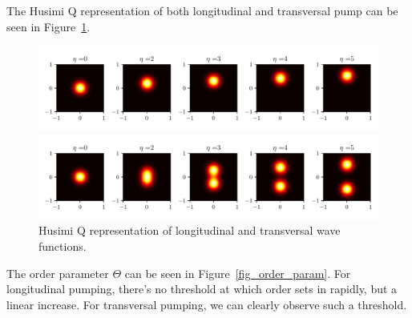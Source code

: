 \noindent The Husimi Q representation of both longitudinal and transversal pump can be seen in Figure~\ref{qfunc}.

\begin{figure}[!htb]
	\begin{minipage}[b]{1\linewidth}
	\centering
	\includegraphics[width=1\textwidth]{images/qfunc_long.pdf}
	\end{minipage}
%
	\begin{minipage}[b]{1\linewidth}
	\centering
	\includegraphics[width=1\textwidth]{images/qfunc_trans.pdf}
	\end{minipage}
\caption{Husimi Q representation of longitudinal and transversal wave functions.}
\label{qfunc}
\end{figure}
\FloatBarrier

\noindent The order parameter $\Theta$ can be seen in Figure~\ref{fig_order_param}. For longitudinal pumping, there's no threshold at which order sets in rapidly, but a linear increase. For transversal pumping, we can clearly observe such a threshold.

